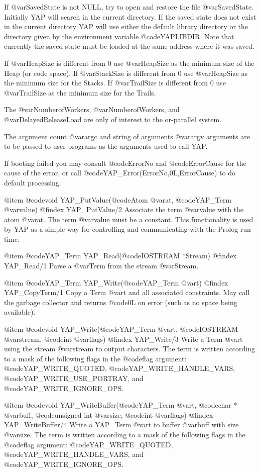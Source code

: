 {{{{{{{{{If @var{SavedState} is not NULL, try to open and restore the file
@var{SavedState}. Initially YAP will search in the current directory. If
the saved state does not exist in the current directory YAP will use
either the default library directory or the directory given by the
environment variable @code{YAPLIBDIR}. Note that currently
the saved state must be loaded at the same address where it was saved.

If @var{HeapSize} is different from 0 use @var{HeapSize} as the minimum
size of the Heap (or code space). If @var{StackSize} is different from 0
use @var{HeapSize} as the minimum size for the Stacks. If
@var{TrailSize} is different from 0 use @var{TrailSize} as the minimum
size for the Trails.

The @var{NumberofWorkers}, @var{NumberofWorkers}, and
@var{DelayedReleaseLoad} are only of interest to the or-parallel system.

The argument count @var{argc} and string of arguments @var{argv}
arguments are to be passed to user programs as the arguments used to
call YAP.

If booting failed you may consult @code{ErrorNo} and @code{ErrorCause}
for the cause of the error, or call
@code{YAP_Error(ErrorNo,0L,ErrorCause)} to do default processing. 


@item  @code{void} YAP_PutValue(@code{Atom} @var{at}, @code{YAP_Term} @var{value})
@findex  YAP_PutValue/2
Associate the term @var{value} with the atom @var{at}. The term
@var{value} must be a constant. This functionality is used by YAP as a
simple way for controlling and communicating with the Prolog run-time.

@item  @code{YAP_Term} YAP_Read(@code{IOSTREAM *Stream})
@findex  YAP_Read/1
Parse a @var{Term} from the stream @var{Stream}.

@item  @code{YAP_Term} YAP_Write(@code{YAP_Term} @var{t})
@findex  YAP_CopyTerm/1
Copy a Term @var{t} and all associated constraints. May call the garbage
collector and returns @code{0L} on error (such as no space being
available).

@item  @code{void} YAP_Write(@code{YAP_Term} @var{t}, @code{IOSTREAM}
@var{stream}, @code{int} @var{flags})
@findex  YAP_Write/3
Write a Term @var{t} using the stream @var{stream} to output
characters. The term is written according to a mask of the following
flags in the @code{flag} argument: @code{YAP_WRITE_QUOTED},
@code{YAP_WRITE_HANDLE_VARS}, @code{YAP_WRITE_USE_PORTRAY},  and @code{YAP_WRITE_IGNORE_OPS}.

@item  @code{void} YAP_WriteBuffer(@code{YAP_Term} @var{t}, @code{char *}
@var{buff}, @code{unsigned int}
@var{size}, @code{int} @var{flags})
@findex  YAP_WriteBuffer/4
Write a YAP_Term @var{t} to buffer @var{buff} with size @var{size}. The
term is written according to a mask of the following flags in the
@code{flag} argument: @code{YAP_WRITE_QUOTED},
@code{YAP_WRITE_HANDLE_VARS}, and @code{YAP_WRITE_IGNORE_OPS}.

}}}}}}}}}
